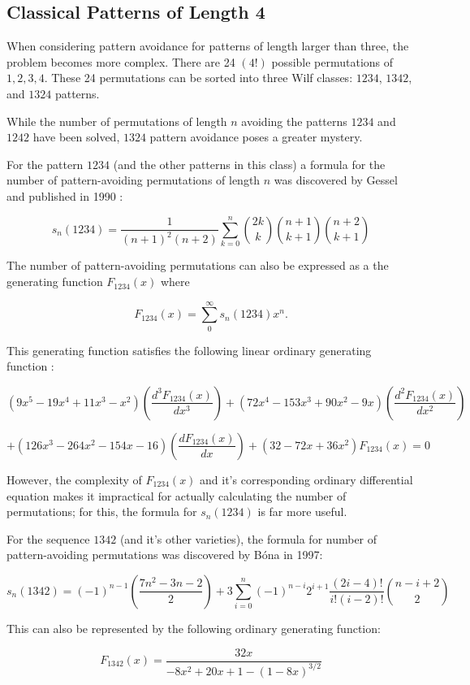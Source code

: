 \documentclass[12pt]{article}
\begin{document}
\subsection{Classical Patterns of Length 4}
When considering pattern avoidance for patterns of length larger than three, the problem becomes more complex. There are 24 $(4!)$ possible permutations of ${1,2,3,4}$. These 24 permutations can be sorted into three Wilf classes: $1234$, $1342$, and $1324$ patterns. 

While the number of permutations of length $n$ avoiding the patterns $1234$ and $1242$ have been solved, $1324$ pattern avoidance poses a greater mystery. 

For the pattern $1234$ (and the other patterns in this class) a formula for the number of pattern-avoiding permutations of length $n$ was discovered by Gessel and published in 1990 \cite{Gessel1990}:

$$s_n(1234) = \frac{1}{(n+1)^2(n+2)}\sum\limits_{k=0}^n\binom{2k}{k}\binom{n+1}{k+1}\binom{n+2}{k+1}$$

The number of pattern-avoiding permutations can also be expressed as a the generating function $F_{1234}(x)$ where

$$F_{1234}(x) = \sum\limits_0^\infty s_n(1234)x^n.$$

This generating function satisfies the following linear ordinary generating function \cite{Conway&Guttman2015}:

$$(9x^5-19x^4+11x^3-x^2)\left(\frac{d^3F_{1234}(x)}{dx^3}\right)+(72x^4-153x^3+90x^2-9x)\left(\frac{d^2F_{1234}(x)}{dx^2}\right)$$

$$+(126x^3-264x^2-154x-16)\left(\frac{dF_{1234}(x)}{dx}\right)+(32-72x+36x^2)F_{1234}(x)=0$$

However, the complexity of $F_{1234}(x)$ and it's corresponding ordinary differential equation makes it impractical for actually calculating the number of permutations; for this, the formula for $s_n(1234)$ is far more useful. 

For the sequence $1342$ (and it's other varieties), the formula for number of pattern-avoiding permutations was discovered by Bóna in 1997:\cite{Bona1997}

$$s_n(1342) = (-1)^{n-1}\left(\frac{7n^2-3n-2}{2}\right)+3\sum\limits_{i=0}^n(-1)^{n-i}2^{i+1}\frac{(2i-4)!}{i!(i-2)!}\binom{n-i+2}{2}$$

This can also be represented by the following ordinary generating function:

$$F_{1342}(x) = \frac{32x}{-8x^2+20x+1-(1-8x)^{3/2}}$$
\end{document}
